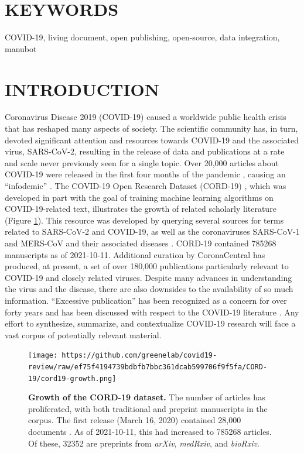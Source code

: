 \documentclass[twocolumn]{ceurart}
\begin{document}
\hypertarget{keywords}{%
\section*{KEYWORDS}\label{keywords}}

COVID-19, living document, open publishing, open-source, data integration, manubot

\hypertarget{introduction}{%
\section{INTRODUCTION}\label{introduction}}

Coronavirus Disease 2019 (COVID-19) caused a worldwide public health crisis that has reshaped many aspects of society.
The scientific community has, in turn, devoted significant attention and resources towards COVID-19 and the associated virus, SARS-CoV-2, resulting in the release of data and publications at a rate and scale never previously seen for a single topic.
Over 20,000 articles about COVID-19 were released in the first four months of the pandemic \citep{7ub6VM4Z}, causing an ``infodemic'' \citep{7ub6VM4Z, nnfOazAC}.
The COVID-19 Open Research Dataset (CORD-19) \citep{CiOwklc6}, which was developed in part with the goal of training machine learning algorithms on COVID-19-related text, illustrates the growth of related scholarly literature (Figure \ref{fig:cord19-growth}).
This resource was developed by querying several sources for terms related to SARS-CoV-2 and COVID-19, as well as the coronaviruses SARS-CoV-1 and MERS-CoV and their associated diseases \citep{CiOwklc6}.
CORD-19 contained 785268 manuscripts as of 2021-10-11.
Additional curation by CoronaCentral \citep{Ybg667S0} has produced, at present, a set of over 180,000 publications particularly relevant to COVID-19 and closely related viruses.
Despite many advances in understanding the virus and the disease, there are also downsides to the availability of so much information.
``Excessive publication'' has been recognized as a concern for over forty years \citep{DfSr1Ohc} and has been discussed with respect to the COVID-19 literature \citep{dUvvJvv6}.
Any effort to synthesize, summarize, and contextualize COVID-19 research will face a vast corpus of potentially relevant material.

\begin{figure}
\hypertarget{fig:cord19-growth}{%
\centering
\texttt{[image: https://github.com/greenelab/covid19-review/raw/ef75f4194739bdbfb7bbc361dcab599706f9f5fa/CORD-19/cord19-growth.png]}
\caption{\textbf{Growth of the CORD-19 dataset.}
The number of articles has proliferated, with both traditional and preprint manuscripts in the corpus.
The first release (March 16, 2020) contained 28,000 documents \citep{CiOwklc6}.
As of 2021-10-11, this had increased to 785268 articles.
Of these, 32352 are preprints from \emph{arXiv}, \emph{medRxiv}, and \emph{bioRxiv}.}\label{fig:cord19-growth}
}
\end{figure}
\end{document}
